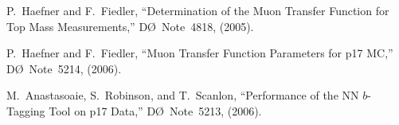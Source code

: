 \documentclass[aps]{revtex4}
\newcommand{\dzero}     {D\O}
\begin{document}
\begin{thebibliography}{99.}
P.~Haefner and F.~Fiedler,
``Determination of the Muon Transfer Function for Top Mass
Measurements,''
{\dzero}~Note~4818, (2005).

P.~Haefner and F.~Fiedler,
``Muon Transfer Function Parameters for p17 MC,''
{\dzero}~Note~5214, (2006).

M.~Anastasoaie, S.~Robinson, and T.~Scanlon,
``Performance of the NN $b$-Tagging Tool on p17 Data,''
{\dzero}~Note~5213, (2006).


\end{thebibliography}

\end{document}
